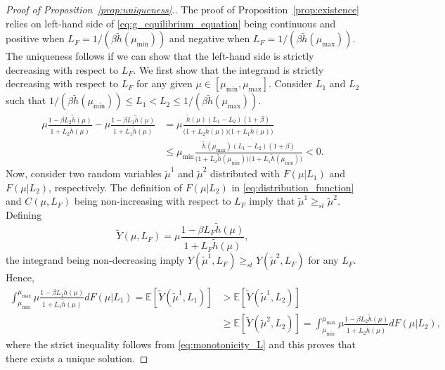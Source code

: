 \documentclass[a4paper,11pt,twoside]{article}
\numberwithin{equation}{section}
\numberwithin{figure}{section}
\theoremstyle{plain}
\newcommand{\EE}{\mathbb{E}}
\newcommand{\1}{\mathbbm{1}}
\begin{document}
\begin{proof}[Proof of Proposition~\ref{prop:uniqueness}.]
The proof of Proposition~\ref{prop:existence} relies on left-hand side of \eqref{eq:g_equilibrium_equation} being continuous and positive when $L_F = 1/(\beta \tilde{h}(\mu_{\min}))$ and negative when $L_F = 1/(\beta \tilde{h}(\mu_{\max}))$. The uniqueness follows if we can show that the left-hand side is strictly decreasing with respect to $L_F$. We first show that the integrand is strictly decreasing with respect to $L_F$ for any given $\mu\in [\mu_{\min},\mu_{\max}]$. Consider $L_1$ and $L_2$ such that $1/(\beta \tilde{h}(\mu_{\min}))\leq L_1<L_2\leq 1/(\beta \tilde{h}(\mu_{\max}))$. 
\begin{align}
    \nonumber \mu\frac{1-\beta L_2\tilde{h}(\mu)}{1+L_2\tilde{h}(\mu)} - \mu\frac{1-\beta L_1\tilde{h}(\mu)}{1+L_1\tilde{h}(\mu)} &= \mu \frac{\tilde{h}(\mu)(L_1 - L_2)(1 + \beta)}{\big(1 + L_2\tilde{h}(\mu)\big)\big(1 + L_1\tilde{h}(\mu)\big)}\\
     &\leq \mu_{\min} \frac{\tilde{h}(\mu_{\max})(L_1 - L_2)(1 + \beta)}{\big(1 + L_2\tilde{h}(\mu_{\min})\big)\big(1 + L_1\tilde{h}(\mu_{\min})\big)}<0. \label{eq:monotonicity_L}
\end{align}
Now, consider two random variables $\tilde{\mu}^1$ and $\tilde{\mu}^2$ distributed with $F(\mu|L_1)$ and $F(\mu|L_2)$, respectively. The definition of $F(\mu|L_2)$ in \eqref{eq:distribution_function} and $C(\mu,L_F)$ being non-increasing with respect to $L_F$ imply that $\tilde{\mu}^1\geq_{st} \tilde{\mu}^2$. Defining
\[
\tilde{Y}(\mu, L_F) = \mu\frac{1-\beta L_F\tilde{h}(\mu)}{1+L_F\tilde{h}(\mu)},
\]
the integrand being non-decreasing imply $Y(\tilde{\mu}^1, L_F)\geq_{st} Y(\tilde{\mu}^2, L_F)$ for any $L_F$. Hence,
\begin{align*}
       \int_{\mu_{\min}}^{\mu_{\max}}\mu\frac{1-\beta L_1\tilde{h}(\mu)}{1+L_1\tilde{h}(\mu)}dF(\mu|L_1) = \EE[\tilde{Y}(\tilde{\mu}^1, L_1)]&>\EE[\tilde{Y}(\tilde{\mu}^1, L_2)]\\&\geq \EE[\tilde{Y}(\tilde{\mu}^2, L_2)] =  \int_{\mu_{\min}}^{\mu_{\max}}\mu\frac{1-\beta L_2\tilde{h}(\mu)}{1+L_2\tilde{h}(\mu)}dF(\mu|L_2),
\end{align*}
where the strict inequality follows from \eqref{eq:monotonicity_L} and this proves that there exists a unique solution. 
\end{proof}
\end{document}
